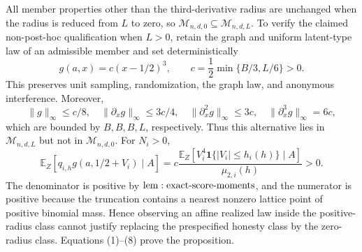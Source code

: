 All member properties other than the third-derivative radius are unchanged when the radius is reduced from \(L\) to zero, so \(\mathcal M_{n,d,0}\subseteq\mathcal M_{n,d,L}\).  To verify the claimed non-post-hoc qualification when \(L>0\), retain the graph and uniform latent-type law of an admissible member and set deterministically
\[
 g(a,x)=c(x-1/2)^3,
 \qquad c=\frac12\min\{B/3,L/6\}>0.
\tag{7}
\]
This preserves unit sampling, randomization, the graph law, and anonymous interference.  Moreover,
\[
 \|g\|_\infty\leq c/8,\quad
 \|\partial_xg\|_\infty\leq3c/4,\quad
 \|\partial_x^2g\|_\infty\leq3c,\quad
 \|\partial_x^3g\|_\infty=6c,
\]
which are bounded by \(B,B,B,L\), respectively.  Thus this alternative lies in \(\mathcal M_{n,d,L}\) but not in \(\mathcal M_{n,d,0}\).  For \(N_i>0\),
\[
 \mathbb E_Z[q_{i,h}g(a,1/2+V_i)\mid A]
 =c\frac{\mathbb E_Z[V_i^4\mathbf1\{|V_i|\leq h_i(h)\}\mid A]}{\mu_{2,i}(h)}>0.
\tag{8}
\]
The denominator is positive by \({\rm lem:exact\text{-}score\text{-}moments}\), and the numerator is positive because the truncation contains a nearest nonzero lattice point of positive binomial mass.  Hence observing an affine realized law inside the positive-radius class cannot justify replacing the prespecified honesty class by the zero-radius class.  Equations (1)--(8) prove the proposition.